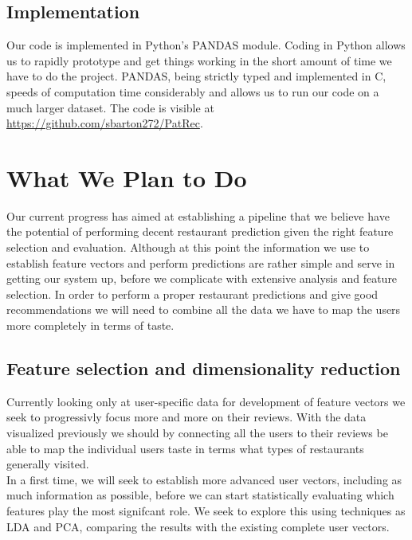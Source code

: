 \documentclass[10pt,twocolumn,letterpaper]{article}
\begin{document}
\subsection{Implementation}
Our code is implemented in Python's PANDAS module. Coding in Python allows us to rapidly prototype and get things working in the short amount of time we have to do the project. PANDAS, being strictly typed and implemented in C, speeds of computation time considerably and allows us to run our code on a much larger dataset. The code is visible at \url{https://github.com/sbarton272/PatRec}.

\section{What We Plan to Do}
Our current progress has aimed at establishing a pipeline that we believe have the potential of performing decent restaurant prediction given the right feature selection and evaluation. Although at this point the information we use to establish feature vectors and perform predictions are rather simple and serve in getting our system up, before we complicate with extensive analysis and feature selection. In order to perform a proper restaurant predictions and give good recommendations we will need to combine all the data we have to map the users more completely in terms of taste.

\subsection{Feature selection and dimensionality reduction}
Currently looking only at user-specific data for development of feature vectors we seek to progressivly focus more and more on their reviews. With the data visualized previously we should by connecting all the users to their reviews be able to map the individual users taste in terms what types of restaurants generally visited. 
\\[.5em]
\indent In a first time, we will seek to establish more advanced user vectors, including as much information as possible, before we can start statistically evaluating which features play the most signifcant role. We seek to explore this using techniques as LDA and PCA, comparing the results with the existing complete user vectors.
\end{document}
